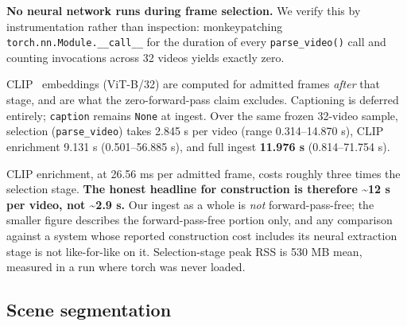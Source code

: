 \documentclass[sigconf,review,anonymous]{acmart}
\begin{document}
\textbf{No neural network runs during frame selection.} We verify this by instrumentation rather
than inspection: monkeypatching \texttt{torch.nn.Module.\_\_call\_\_} for the duration of every
\texttt{parse\_video()} call and counting invocations across 32 videos yields exactly zero.

CLIP~\cite{radford2021clip} embeddings (ViT-B/32) are computed for admitted frames \emph{after} that stage, and are what
the zero-forward-pass claim excludes. Captioning is deferred entirely; \texttt{caption} remains
\texttt{None} at ingest. Over the same frozen 32-video sample, selection (\texttt{parse\_video}) takes
2.845 s per video (range 0.314--14.870 s), CLIP enrichment 9.131 s (0.501--56.885 s), and full
ingest \textbf{11.976 s} (0.814--71.754 s).

CLIP enrichment, at 26.56 ms per admitted frame, costs roughly three times the selection stage.
\textbf{The honest headline for construction is therefore \textasciitilde12 s per video, not \textasciitilde2.9 s.} Our ingest
as a whole is \emph{not} forward-pass-free; the smaller figure describes the forward-pass-free
portion only, and any comparison against a system whose reported construction cost includes
its neural extraction stage is not like-for-like on it. Selection-stage peak RSS is 530 MB
mean, measured in a run where torch was never loaded.

\subsection{Scene segmentation}
\end{document}
